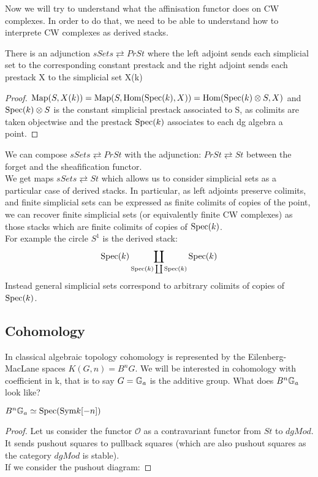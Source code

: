 \begin{refsection}
Now we will try to understand what the affinisation functor does on CW complexes. In order to do that, we need to be able to understand how to interprete
CW complexes as derived stacks.
\begin{proposition}
There is an adjunction $sSets \rightleftarrows PrSt$ where the left adjoint sends each simplicial set 
to the corresponding constant prestack and the right adjoint sends each prestack X to the simplicial set X(k)
\end{proposition}

\begin{proof}
$\operatorname{\mathrm{Map}}(S,X(k))=\operatorname{\mathrm{Map}}(S,\mathrm{Hom}(\mathrm{Spec}(k), X))=\mathrm{Hom}(\mathrm{Spec}(k)\otimes S, X)$ and $\mathrm{Spec}(k)\otimes S$ is the constant simplicial prestack associated to S, as colimits are taken objectwise
and the prestack $\mathrm{Spec}(k)$ associates to each dg algebra a point.
\end{proof}

We can compose $sSets \rightleftarrows PrSt$ with the adjunction: $PrSt\rightleftarrows St$ between the forget and the sheafification functor.\\
We get maps $sSets \rightleftarrows St$ which allows us to consider simplicial sets as a particular case of derived stacks.
In particular, as left adjoints preserve colimits, and finite simplicial
sets can be expressed as finite colimits of copies of the point, we can recover finite simplicial sets (or equivalently finite CW complexes) as those stacks 
which are finite colimits of copies
of $\mathrm{Spec}(k)$.\\
For example the circle $S^1$ is the derived stack:
$$\mathrm{Spec}(k)\coprod_{\mathrm{Spec}(k)\coprod \mathrm{Spec}(k)}\mathrm{Spec}(k)$$
Instead general simplicial sets correspond to arbitrary colimits of copies of $\mathrm{Spec}(k)$.\\

\subsection{Cohomology}
In classical algebraic topology cohomology is represented by the Eilenberg-MacLane spaces $K(G,n)=B^nG$. We will be interested in cohomology with coefficient
in k, that is to say $G=\mathbb{G}_a$ is the additive group. What does $B^n\mathbb{G}_a$ look like? 

\begin{proposition}
$B^n\mathbb{G}_a\simeq \mathrm{Spec}(\text{Sym} k[-n])$
\end{proposition}
\begin{proof}
Let us consider the functor $\mathcal{O}$ as a contravariant functor from $St$ to $dgMod$. It sends pushout squares to pullback squares (which are also pushout squares
as the category $dgMod$ is stable).\\
If we consider the pushout diagram:


\end{proof}
\end{refsection}
